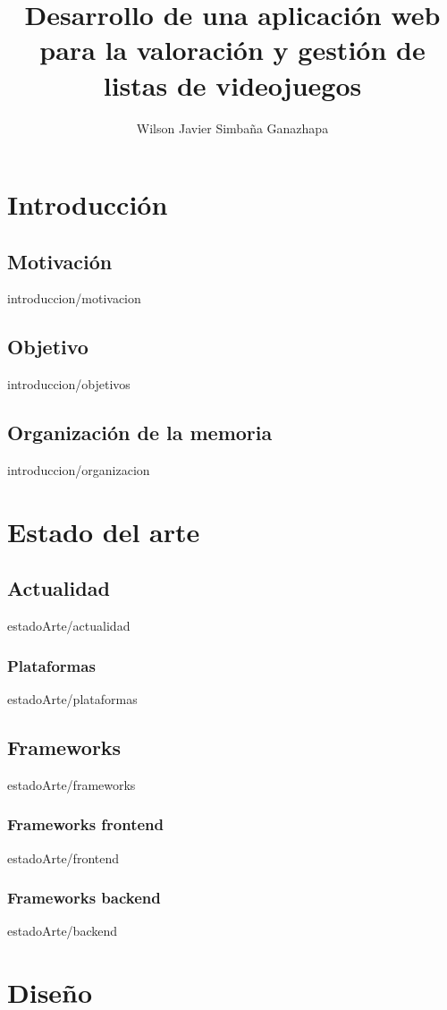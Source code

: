 \documentclass[epsbased,copyright,final,printable,covers,extendedindex,firstnumbered,tfg,gnuplot]{tfgtfmthesisuam}
\title{Desarrollo de una aplicación web para la valoración y gestión de listas de videojuegos}
\author{Wilson Javier Simbaña Ganazhapa}
\begin{document}
\chapter{Introducción\label{CAP:INTRODUCCION}}{}
  \section{Motivación\label{SEC:MOVIVACION}}{introduccion/motivacion}
  \section{Objetivo\label{SEC:OBJETIVO}}{introduccion/objetivos}
  \section{Organización de la memoria\label{SEC:ORGANIZACION}}{introduccion/organizacion}

\chapter{Estado del arte\label{CAP:ESTADODELARTE}}{}
  \section{Actualidad\label{SEC:ACTUALIDAD}}{estadoArte/actualidad}
    \subsection{Plataformas\label{SS:PLATAFORMAS}}{estadoArte/plataformas}
  \section{Frameworks\label{SEC:FRAMEWORKS}}{estadoArte/frameworks}
    \subsection{Frameworks frontend\label{SS:FRONTEND}}{estadoArte/frontend}
    \subsection{Frameworks backend\label{SS:BACKEND}}{estadoArte/backend}

\chapter{Diseño\label{CAP:DISENO}}{}
\end{document}
